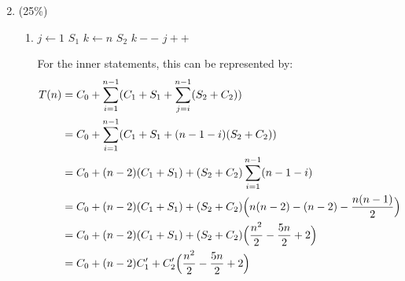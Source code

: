 \documentclass[11pt]{article}
\begin{document}
\begin{enumerate}
\setcounter{enumi}{1}

\item (25\%)
\begin{enumerate}
\item 

\begin{algorithmic}
\State $j \gets 1 $ 
 
    \State $S_1$  
	\State $k \gets n$ 
	 
		\State $S_2$ 
		\State $k--$ 
	\EndWhile
	\State $j++$ 
\EndWhile
\end{algorithmic}

For the inner statements, this can be represented by:
\begin{align*}
T(n) &= C_0 + \sum_{i=1}^{n-1}(C_1+S_1+\sum_{j=i}^{n-1}(S_2+C_2))
\\&= C_0+\sum_{i=1}^{n-1}(C_1+S_1+(n-1-i)(S_2+C_2))
\\&=C_0+(n-2)(C_1+S_1)+(S_2+C_2)\sum_{i=1}^{n-1}(n-1-i)
\\&=C_0+(n-2)(C_1+S_1)+(S_2+C_2)\Bigl(n(n-2)-(n-2)-\frac{n(n-1)}{2}\Bigr)
\\&=C_0+(n-2)(C_1+S_1)+(S_2+C_2)\Bigl(\frac{n^2}{2} - \frac{5n}{2}+2 \Bigr)
\\&=C_0 + (n-2)C_1'+C_2'\Bigl(\frac{n^2}{2} - \frac{5n}{2}+2 \Bigr)
\end{align*}
\end{enumerate}
\end{enumerate}
\end{document}
